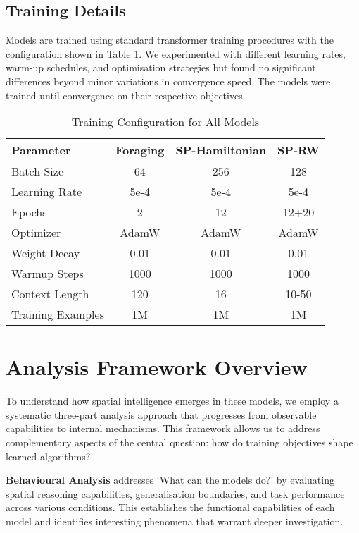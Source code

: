 \subsection{Training Details}

Models are trained using standard transformer training procedures with the configuration shown in Table \ref{tab:training_config}. We experimented with different learning rates, warm-up schedules, and optimisation strategies but found no significant differences beyond minor variations in convergence speed. The models were trained until convergence on their respective objectives.

\begin{table}[ht]
\centering
\caption{Training Configuration for All Models}
\label{tab:training_config}
\begin{tabular}{lccc}
\hline
Parameter & Foraging & SP-Hamiltonian & SP-RW \\
\hline
Batch Size & 64 & 256 & 128 \\
Learning Rate & 5e-4 & 5e-4 & 5e-4 \\
Epochs & 2 & 12 & 12+20 \\
Optimizer & AdamW & AdamW & AdamW \\
Weight Decay & 0.01 & 0.01 & 0.01 \\
Warmup Steps & 1000 & 1000 & 1000 \\
Context Length & 120 & 16 & 10-50 \\
Training Examples & 1M & 1M & 1M \\
\hline
\end{tabular}
\end{table}


\section{Analysis Framework Overview}

To understand how spatial intelligence emerges in these models, we employ a systematic three-part analysis approach that progresses from observable capabilities to internal mechanisms. This framework allows us to address complementary aspects of the central question: how do training objectives shape learned algorithms?

\textbf{Behavioural Analysis} addresses `What can the models do?' by evaluating spatial reasoning capabilities, generalisation boundaries, and task performance across various conditions. This establishes the functional capabilities of each model and identifies interesting phenomena that warrant deeper investigation.

